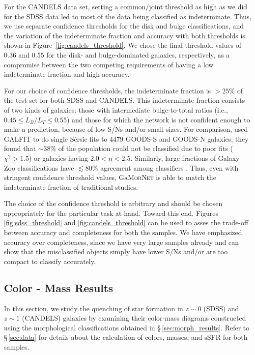 \documentclass[twocolumn]{aastex63}
\newcommand\sersic{S\'ersic}
\newcommand\gamornet{G\textsc{a}M\textsc{or}N\textsc{et}}
\begin{document}
For the CANDELS data set, setting a common/joint threshold as high as we did for the SDSS data led to most of the data being classified as indeterminate. Thus, we use separate confidence thresholds for the disk and bulge classifications, and the variation of the indeterminate fraction and accuracy with both thresholds is shown in Figure~\ref{fig:candels_threshold}. We chose the final threshold values of 0.36 and 0.55 for the disk- and bulge-dominated galaxies, respectively, as a compromise between the two competing requirements of having a low indeterminate fraction and high accuracy. 

For our choice of confidence thresholds, the indeterminate fraction is $> 25\%$ of the test set for both SDSS and CANDELS. This indeterminate fraction consists of two kinds of galaxies: those with intermediate bulge-to-total ratios (i.e., $0.45 \leq L_B/L_T \leq 0.55$) and those for which the network is not confident enough to make a prediction, because of low S/Ns and/or small sizes. For comparison, \citet{powell_17} used GALFIT to do single \sersic{} fits to 4479 GOODS-S and GOODS-N galaxies; they found that $\sim 38\%$ of the population could not be classified due to poor fits ($\chi^2 > 1.5$) or galaxies having $2.0 < n < 2.5$. Similarly, large fractions of Galaxy Zoo classifications have $\lesssim 80\%$ agreement among classifiers \citep{land_2008}. Thus, even with stringent confidence threshold values, \gamornet{} is able to match the indeterminate fraction of traditional studies. 

The choice of the confidence threshold is arbitrary and should be chosen appropriately for the particular task at hand. Toward this end, Figures \ref{fig:sdss_threshold} and \ref{fig:candels_threshold} can be used to asses the trade-off between accuracy and completeness for both the samples. We have emphasized accuracy over completeness, since we have very large samples already and can show that the misclassified objects simply have lower S/Ns and/or are too compact to classify accurately.

\vspace{1.0cm}

\subsection{Color - Mass Results}\label{sec:cm_results}
In this section, we study the quenching of star formation in  $z\sim0$ (SDSS) and $z\sim1$ (CANDELS) galaxies by examining their color-mass diagrams constructed using the morphological classifications obtained in \S\,\ref{sec:morph_results}. Refer to \S\,\ref{sec:data} for details about the calculation of colors, masses, and sSFR for both samples. 
\end{document}
